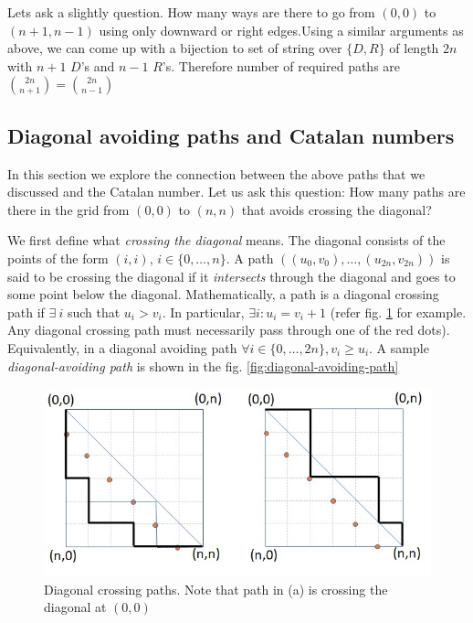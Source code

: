 Lets ask a slightly question. How many ways are there to go from $(0,0)$ to $(n+1,n-1)$ using only downward or right edges.Using a similar arguments as above, we can come up with a bijection to set of string over $\{D,R\}$ of length $2n$ with $n+1$ $D$'s and $n-1$ $R$'s. Therefore number of required paths are $\binom{2n}{n+1}=\binom{2n}{n-1}$


\subsection{Diagonal avoiding paths and Catalan numbers}
In this section we explore the connection  between the above paths that we discussed and the Catalan number. 
Let us ask this question:
How many paths are there in the grid from $(0,0)$ to $(n,n)$ that avoids crossing the diagonal? 

We first define what \textit{crossing the diagonal} means. The diagonal consists of the points of the form $(i,i)$, $i\in\{0,\ldots, n\}$. A path $((u_0,v_0), \ldots, (u_{2n},v_{2n}))$ is said to be crossing the diagonal if it \textit{intersects} through the diagonal and goes to some point below the diagonal. Mathematically, a path is a diagonal crossing path if $\exists~i$ such that $u_i>v_i$. In particular, $\exists i: u_i = v_i+1$ (refer fig. \ref{fig:diagonal-crossing-path} for example. Any diagonal crossing path must necessarily pass through one of the red dots). Equivalently, in a diagonal avoiding path $\forall i\in\{0,\ldots, 2n\}, v_i\ge u_i$. A sample \emph{diagonal-avoiding path} is shown in the fig. \ref{fig:diagonal-avoiding-path} %
\begin{figure}[h!]
    \centering
    \includegraphics[width=0.7\linewidth]{images/diagonal-crossing.jpeg}
    \caption{Diagonal crossing paths. Note that path in (a) is crossing the diagonal at $(0,0)$}
    \label{fig:diagonal-crossing-path}
\end{figure}

